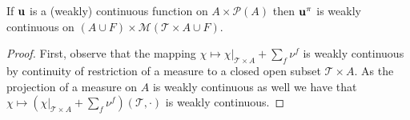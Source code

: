 \documentclass[10pt,a4paper]{amsart}
\begin{document}
\begin{lemma}
\label{Lem_ContinuityExpUtil}
If $\bold{u}$ is a (weakly) continuous function on $A \times \mathcal{P}(A)$ then $\bold{u}^{\pi}$ is weakly continuous on $(A \cup F) \times \mathcal{M}(\mathcal{T} \times {A}\cup F)$.
\end{lemma}

\begin{proof}
First, observe that the mapping $\chi \mapsto \chi|_{\mathcal{T} \times A} + \sum_{f} \nu^f$ is weakly continuous by continuity of restriction of a measure to a closed open subset $\mathcal{T} \times A$. As the projection of a measure on $A$ is weakly continuous as well we have that  
$\chi \mapsto (\chi|_{\mathcal{T} \times A} + \sum_{f} \nu^f)(\mathcal{T}, \cdot)$ is weakly continuous.


\end{proof}
\end{document}
